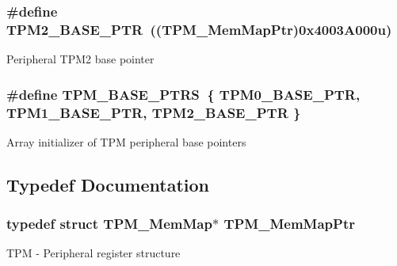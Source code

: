\subsubsection[{T\+P\+M2\+\_\+\+B\+A\+S\+E\+\_\+\+P\+T\+R}]{\setlength{\rightskip}{0pt plus 5cm}\#define T\+P\+M2\+\_\+\+B\+A\+S\+E\+\_\+\+P\+T\+R~(({\bf T\+P\+M\+\_\+\+Mem\+Map\+Ptr})0x4003\+A000u)}\label{group___t_p_m___peripheral_ga37cc120e7475fb646fe9bc15b57f06bc}
Peripheral T\+P\+M2 base pointer \hypertarget{group___t_p_m___peripheral_ga1d61ed554c056d8f63d1dbcc7ce05e62}{}
\subsubsection[{T\+P\+M\+\_\+\+B\+A\+S\+E\+\_\+\+P\+T\+R\+S}]{\setlength{\rightskip}{0pt plus 5cm}\#define T\+P\+M\+\_\+\+B\+A\+S\+E\+\_\+\+P\+T\+R\+S~\{ {\bf T\+P\+M0\+\_\+\+B\+A\+S\+E\+\_\+\+P\+T\+R}, {\bf T\+P\+M1\+\_\+\+B\+A\+S\+E\+\_\+\+P\+T\+R}, {\bf T\+P\+M2\+\_\+\+B\+A\+S\+E\+\_\+\+P\+T\+R} \}}\label{group___t_p_m___peripheral_ga1d61ed554c056d8f63d1dbcc7ce05e62}
Array initializer of T\+P\+M peripheral base pointers 

\subsection{Typedef Documentation}
\hypertarget{group___t_p_m___peripheral_ga32147338cedc9904efff0d19b3a358ac}{}
\subsubsection[{T\+P\+M\+\_\+\+Mem\+Map\+Ptr}]{\setlength{\rightskip}{0pt plus 5cm}typedef struct {\bf T\+P\+M\+\_\+\+Mem\+Map}$\ast$ {\bf T\+P\+M\+\_\+\+Mem\+Map\+Ptr}}\label{group___t_p_m___peripheral_ga32147338cedc9904efff0d19b3a358ac}
T\+P\+M -\/ Peripheral register structure 